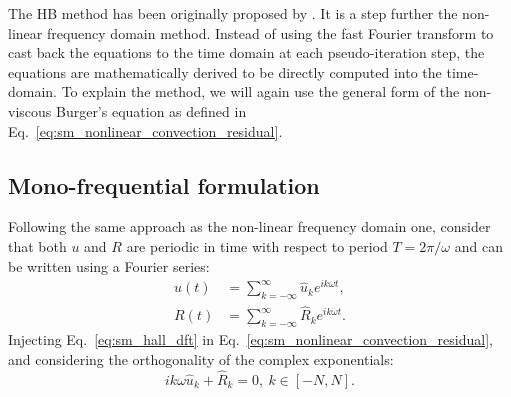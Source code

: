 
The HB method has been originally
 proposed by \citet{Hall2002}.
It is a step further the non-linear frequency domain method. Instead
of using the fast Fourier transform to cast back the equations
to the time domain at each pseudo-iteration step, 
the equations are mathematically derived to be directly
computed into the time-domain.
To explain the method, we will again use the general form of 
the non-viscous Burger's equation as defined in
Eq.~\eqref{eq:sm_nonlinear_convection_residual}.


\subsection{Mono-frequential formulation}

Following the same approach as the non-linear frequency domain one,
consider that both $u$ and $R$ are periodic
in time with respect to period $T = 2 \pi / \omega$
and can be written using a Fourier series:
\begin{equation}
	\begin{split}
		u(t) &= \sum_{k=-\infty}^{\infty} \widehat{u}_k e^{i k \omega t}, \\
		R(t) &= \sum_{k=-\infty}^{\infty} \widehat{R}_k e^{i k \omega t}.
		\label{eq:sm_hall_dft}
	\end{split}
\end{equation}
Injecting Eq.~\eqref{eq:sm_hall_dft} in 
Eq.~\eqref{eq:sm_nonlinear_convection_residual}, and considering
the orthogonality of the complex exponentials:
\begin{equation}
	i k \omega \widehat{u}_k + \widehat{R}_k = 0, \: k \in [-N, N].
	\label{eq:sm_hall_frequential_eq}
\end{equation}

